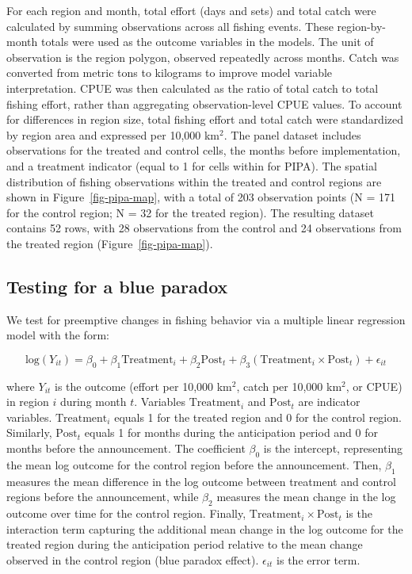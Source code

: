 \documentclass[
  letterpaper,
  DIV=11,
  numbers=noendperiod]{scrartcl}
\begin{document}
For each region and month, total effort (days and sets) and total catch
were calculated by summing observations across all fishing events. These
region-by-month totals were used as the outcome variables in the models.
The unit of observation is the region polygon, observed repeatedly
across months. Catch was converted from metric tons to kilograms to
improve model variable interpretation. CPUE was then calculated as the
ratio of total catch to total fishing effort, rather than aggregating
observation-level CPUE values. To account for differences in region
size, total fishing effort and total catch were standardized by region
area and expressed per 10,000 km\(^2\). The panel dataset includes
observations for the treated and control cells, the months before
implementation, and a treatment indicator (equal to 1 for cells within
for PIPA). The spatial distribution of fishing observations within the
treated and control regions are shown in Figure~\ref{fig-pipa-map}, with
a total of 203 observation points (N = 171 for the control region; N =
32 for the treated region). The resulting dataset contains 52 rows, with
28 observations from the control and 24 observations from the treated
region (Figure~\ref{fig-pipa-map}).

\subsection{Testing for a blue
paradox}\label{testing-for-a-blue-paradox}

We test for preemptive changes in fishing behavior via a multiple linear
regression model with the form:

\[\text{log}(Y_{it}) = \beta_0 + \beta_1\text{Treatment}_i + \beta_2\text{Post}_t + \beta_3(\text{Treatment}_i \times \text{Post}_t) + \epsilon_{it}\]

where \(Y_{it}\) is the outcome (effort per 10,000 km\(^2\), catch per
10,000 km\(^2\), or CPUE) in region \(i\) during month \(t\). Variables
\(\text{Treatment}_i\) and \(\text{Post}_t\) are indicator variables.
\(\text{Treatment}_i\) equals 1 for the treated region and 0 for the
control region. Similarly, \(\text{Post}_t\) equals 1 for months during
the anticipation period and 0 for months before the announcement. The
coefficient \(\beta_0\) is the intercept, representing the mean log
outcome for the control region before the announcement. Then,
\(\beta_1\) measures the mean difference in the log outcome between
treatment and control regions before the announcement, while \(\beta_2\)
measures the mean change in the log outcome over time for the control
region. Finally, \(\text{Treatment}_i \times \text{Post}_t\) is the
interaction term capturing the additional mean change in the log outcome
for the treated region during the anticipation period relative to the
mean change observed in the control region (blue paradox effect).
\(\epsilon_{it}\) is the error term.
\end{document}
